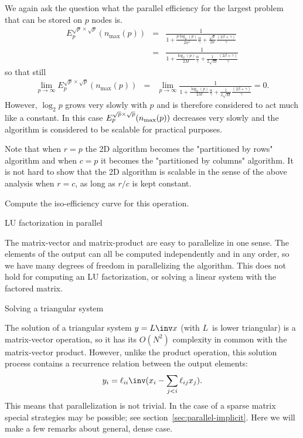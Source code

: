 We again ask the question what the parallel 
efficiency for the largest problem that can be stored on $ p $ nodes is.
\begin{eqnarray*}
E_p^{\sqrt{p} \times \sqrt{p}}(n_{\max}(p)) &=& 
\frac{1}
{ 1 + \frac{p \log_2(p)}{2 n^2} \frac{\alpha}{\gamma} 
+ \frac{\sqrt{p}}{2n}\frac{
\left( 2 \beta + \gamma \right)}{\gamma}}
\\
&=&
\frac{1}
{ 1 + \frac{\log_2(p)}{2 M} \frac{\alpha}{\gamma} 
+ \frac{1}{2\sqrt{M}}\frac{
\left( 2 \beta + \gamma \right)}{\gamma}}
\end{eqnarray*}
so that still
\begin{eqnarray*}
\lim_{p \rightarrow \infty}
E_p^{\sqrt{p} \times \sqrt{p}}(n_{\max}(p)) &=& 
\lim_{p \rightarrow \infty}
\frac{1}
{ 1 + \frac{\log_2(p)}{2 M} \frac{\alpha}{\gamma} 
+ \frac{1}{2\sqrt{M}}\frac{
\left( 2 \beta + \gamma \right)}{\gamma}}
=
0.
\end{eqnarray*}
However, $ \log_2{p} $ grows very slowly with $ p $ and is therefore
considered to act much like a constant.  In this case 
$ E_p^{\sqrt{p}\times \sqrt{p}}( n_{\rm max}(p) ) $ decreases very slowly and the algorithm is considered to be scalable for practical purposes.


Note that when $ r = p $ the 2D algorithm becomes the "partitioned by
rows" algorithm and when $ c = p $ it becomes the "partitioned by
columns" algorithm.  It is not hard to show that the 2D algorithm is
scalable in the sense of the above analysis
when $ r = c $, as long as $r/c$ is kept constant.

\begin{exercise}
  Compute the iso-efficiency curve for this operation.
\end{exercise}


 {LU factorization in parallel}

The matrix-vector and matrix-product are easy to parallelize in one sense.
The elements of the output can all be computed independently and in any order,
so we have many degrees of freedom in parallelizing the algorithm.
This does not hold for computing an LU factorization, or solving a linear system
with the factored matrix.

 {Solving a triangular system}

The solution of a triangular system $y=L\inv x$ (with $L$~is lower triangular)
is a matrix-vector operation, so
it has its $O(N^2)$ complexity in common with the matrix-vector product.
However, unlike the product operation, this solution process contains a recurrence
relation between the output elements: 
\[ y_{i} = \ell_{ii}\inv ( x_i-\sum_{j<i} \ell_{ij}x_j ). \]
This means that parallelization is not trivial.
In the case of a sparse matrix special strategies may be possible; see section~\ref{sec:parallel-implicit}.
Here we will make a few remarks about general, dense case.

